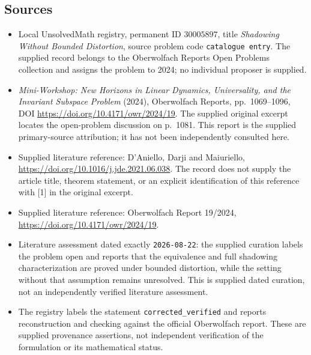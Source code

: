 \documentclass[11pt]{article}
\begin{document}
\subsection{Sources}
\begin{itemize}
\item Local UnsolvedMath registry, permanent ID \(30005897\), title \emph{Shadowing Without Bounded Distortion}, source problem code \texttt{catalogue entry}. The supplied record belongs to the Oberwolfach Reports Open Problems collection and assigns the problem to 2024; no individual proposer is supplied.
\item \emph{Mini-Workshop: New Horizons in Linear Dynamics, Universality, and the Invariant Subspace Problem} (2024), Oberwolfach Reports, pp.\ 1069--1096, DOI \url{https://doi.org/10.4171/owr/2024/19}. The supplied original excerpt locates the open-problem discussion on p.\ 1081. This report is the supplied primary-source attribution; it has not been independently consulted here.
\item Supplied literature reference: D'Aniello, Darji and Maiuriello, \url{https://doi.org/10.1016/j.jde.2021.06.038}. The record does not supply the article title, theorem statement, or an explicit identification of this reference with [1] in the original excerpt.
\item Supplied literature reference: Oberwolfach Report 19/2024, \url{https://doi.org/10.4171/owr/2024/19}.
\item Literature assessment dated exactly \texttt{2026-08-22}: the supplied curation labels the problem open and reports that the equivalence and full shadowing characterization are proved under bounded distortion, while the setting without that assumption remains unresolved. This is supplied dated curation, not an independently verified literature assessment.
\item The registry labels the statement \texttt{corrected\_verified} and reports reconstruction and checking against the official Oberwolfach report. These are supplied provenance assertions, not independent verification of the formulation or its mathematical status.
\end{itemize}
\end{document}
